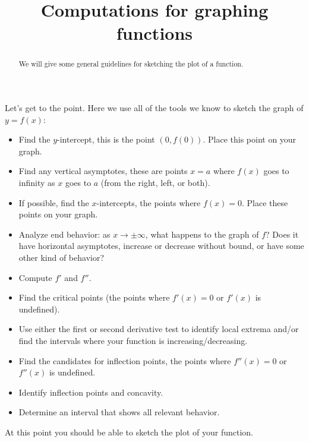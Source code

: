\documentclass[wordchoicegiven]{ximera}
\title[Dig-In:]{Computations for graphing functions}
\begin{document}
\begin{abstract}
  We will give some general guidelines for sketching the plot of a
  function.
\end{abstract}
\maketitle

Let's get to the point. Here we use all of the tools we know to sketch
the graph of $y=f(x)$:


\begin{itemize}
\item Find the $y$-intercept, this is the point $(0,f(0))$. Place this
  point on your graph.
\item Find any vertical asymptotes, these are points $x=a$ where
  $f(x)$ goes to infinity as $x$ goes to $a$ (from the right, left, or
  both).
  \item If possible, find the $x$-intercepts, the points where $f(x) =
  0$. Place these points on your graph.
\item Analyze end behavior:  as $x \to \pm \infty$, what happens to the graph of $f$?  Does it  have horizontal asymptotes, increase or decrease without bound, or have some other kind of behavior?
\item Compute $f'$ and $f''$.
\item Find the critical points (the points where $f'(x) = 0$ or
  $f'(x)$ is undefined).
\item Use either the first or second derivative test to identify local extrema and/or
  find the intervals where your function is increasing/decreasing.
\item Find the candidates for inflection points, the points where
  $f''(x) = 0$ or $f''(x)$ is undefined.
\item Identify inflection points and concavity.

\item Determine an interval that shows all relevant behavior.
\end{itemize}
At this point you should be able to sketch the plot of your function.
\end{document}
